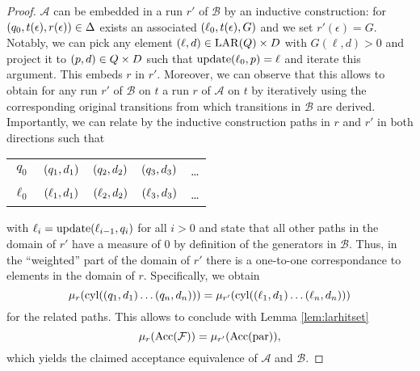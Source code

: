 \begin{proof}
  $\mathcal{A}$ can be embedded in a run $r'$ of $\mathcal{B}$ by an 
  inductive construction: for $\left(q_{0}, t(\epsilon), r(\epsilon)\right)\in
  \Delta$ exists an associated $\left(\ell_{0}, t(\epsilon), G\right)$ and we set
  $r'(\epsilon) = G$. Notably, we can pick any element 
  $\left(\ell, d\right)\in\operatorname{LAR}(Q)\times D$ with $G(\ell, d) > 0$ and project it to
  $\left(p, d\right)\in Q\times D$ such that $\operatorname{update}(\ell_{0}, p) = \ell$ and iterate
  this argument. This embeds $r$ in $r'$. Moreover, we can observe that this 
  allows to obtain for any run $r'$ of $\mathcal{B}$ on $t$ a run $r$ of 
  $\mathcal{A}$ on $t$ by iteratively using the corresponding original 
  transitions from which transitions in $\mathcal{B}$ are derived. Importantly, 
  we can relate by the inductive construction paths in $r$ and $r'$ in both 
  directions such that
  \begin{center}
    \begin{tabular}{ccccc}
      $q_{0}$ & $\left(q_{1}, d_{1}\right)$ & $\left(q_{2}, d_{2}\right)$ & 
        $\left(q_{3}, d_{3}\right)$ & \dots\\
      $\ell_{0}$ & $\left(\ell_{1}, d_{1}\right)$ & $\left(\ell_{2}, d_{2}\right)$ & 
        $\left(\ell_{3}, d_{3}\right)$ & \dots
    \end{tabular}
  \end{center}
  with $\ell_{i} = \operatorname{update}(\ell_{i-1}, q_{i})$ for all $i>0$ and state that all 
  other paths in the domain of $r'$ have a measure of $0$ by definition of the
  generators in $\mathcal{B}$. Thus, in the \enquote{weighted} part of the 
  domain of $r'$ there is a one-to-one correspondance to elements in the domain
  of $r$. Specifically, we obtain
  \begin{equation*}
    \mu_{r}(\operatorname{cyl}(\left(q_{1},d_{1}\right)\dots\left(q_{n},d_{n}\right))) = 
      \mu_{r'}(\operatorname{cyl}(\left(\ell_{1},d_{1}\right)\dots\left(\ell_{n},d_{n}\right)))
  \end{equation*}
  for the related paths. This allows to conclude with Lemma \ref{lem:larhitset}
  \begin{equation*}
    \mu_{r}(\operatorname{Acc}(\mathcal{F})) = \mu_{r'}(\operatorname{Acc}(\operatorname{par})),
  \end{equation*} 
  which yields the claimed acceptance equivalence of $\mathcal{A}$ and 
  $\mathcal{B}$.
\end{proof}

